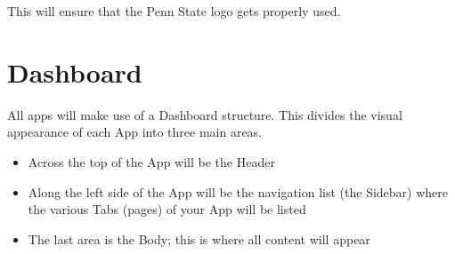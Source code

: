 \documentclass[
]{book}
\newenvironment{Shaded}{\begin{snugshade}}{\end{snugshade}}
\newcommand{\CommentTok}[1]{\textcolor[rgb]{0.56,0.35,0.01}{\textit{#1}}}
\newcommand{\DataTypeTok}[1]{\textcolor[rgb]{0.13,0.29,0.53}{#1}}
\newcommand{\DecValTok}[1]{\textcolor[rgb]{0.00,0.00,0.81}{#1}}
\newcommand{\KeywordTok}[1]{\textcolor[rgb]{0.13,0.29,0.53}{\textbf{#1}}}
\newcommand{\NormalTok}[1]{#1}
\newcommand{\OperatorTok}[1]{\textcolor[rgb]{0.81,0.36,0.00}{\textbf{#1}}}
\newcommand{\StringTok}[1]{\textcolor[rgb]{0.31,0.60,0.02}{#1}}
\providecommand{\tightlist}{%
  \setlength{\itemsep}{0pt}\setlength{\parskip}{0pt}}
\begin{document}
\begin{Shaded}
\end{Shaded}

This will ensure that the Penn State logo gets properly used.

\hypertarget{dashboard}{%
\section{Dashboard}\label{dashboard}}

All apps will make use of a Dashboard structure. This divides the visual appearance of each App into three main areas.

\begin{itemize}
\tightlist
\item
  Across the top of the App will be the Header
\item
  Along the left side of the App will be the navigation list (the Sidebar) where the various Tabs (pages) of your App will be listed
\item
  The last area is the Body; this is where all content will appear
\end{itemize}
\end{document}

